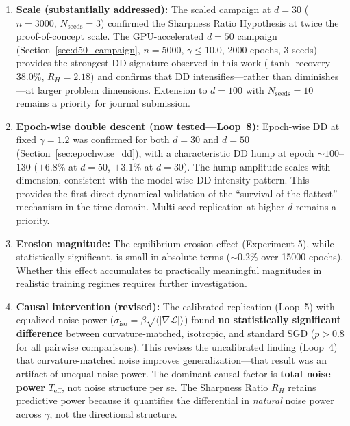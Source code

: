 \documentclass[
  journal=largetwo,
  simfonts=false,
  year=2025,
  volume=37,
]{cup-journal}
\begin{document}
\begin{enumerate}
    \item \textbf{Scale (substantially addressed):} The scaled campaign at $d=30$ ($n=3000$, $N_{\mathrm{seeds}}=3$) confirmed the Sharpness Ratio Hypothesis at twice the proof-of-concept scale. The GPU-accelerated $d=50$ campaign (Section~\ref{sec:d50_campaign}, $n=5000$, $\gamma \leq 10.0$, 2000 epochs, 3 seeds) provides the strongest DD signature observed in this work ($\tanh$ recovery $38.0\%$, $R_H=2.18$) and confirms that DD intensifies---rather than diminishes---at larger problem dimensions. Extension to $d=100$ with $N_{\mathrm{seeds}}=10$ remains a priority for journal submission.

    \item \textbf{Epoch-wise double descent (now tested---Loop~8):} Epoch-wise DD at fixed $\gamma=1.2$ was confirmed for both $d=30$ and $d=50$ (Section~\ref{sec:epochwise_dd}), with a characteristic DD hump at epoch $\sim 100$--$130$ ($+6.8\%$ at $d=50$, $+3.1\%$ at $d=30$). The hump amplitude scales with dimension, consistent with the model-wise DD intensity pattern. This provides the first direct dynamical validation of the ``survival of the flattest'' mechanism in the time domain. Multi-seed replication at higher $d$ remains a priority.

    \item \textbf{Erosion magnitude:} The equilibrium erosion effect (Experiment 5), while statistically significant, is small in absolute terms ($\sim$0.2\% over 15000 epochs). Whether this effect accumulates to practically meaningful magnitudes in realistic training regimes requires further investigation.

    \item \textbf{Causal intervention (revised):} The calibrated replication (Loop~5) with equalized noise power ($\sigma_{\mathrm{iso}} = \beta\sqrt{\langle|\nabla\mathcal{L}|\rangle}$) found \textbf{no statistically significant difference} between curvature-matched, isotropic, and standard SGD ($p > 0.8$ for all pairwise comparisons). This revises the uncalibrated finding (Loop~4) that curvature-matched noise improves generalization---that result was an artifact of unequal noise power. The dominant causal factor is \textbf{total noise power} $T_{\mathrm{eff}}$, not noise structure per se. The Sharpness Ratio $R_H$ retains predictive power because it quantifies the differential in \emph{natural} noise power across $\gamma$, not the directional structure.


\end{enumerate}
\end{document}
